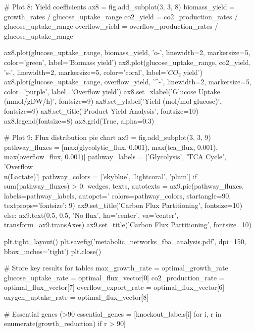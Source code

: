 \documentclass[a4paper, 11pt]{article}
\begin{document}
\begin{pycode}
# Plot 8: Yield coefficients
ax8 = fig.add_subplot(3, 3, 8)
biomass_yield = growth_rates / glucose_uptake_range
co2_yield = co2_production_rates / glucose_uptake_range
overflow_yield = overflow_production_rates / glucose_uptake_range

ax8.plot(glucose_uptake_range, biomass_yield, 'o-', linewidth=2, markersize=5,
         color='green', label='Biomass yield')
ax8.plot(glucose_uptake_range, co2_yield, 's-', linewidth=2, markersize=5,
         color='coral', label='$CO_2$ yield')
ax8.plot(glucose_uptake_range, overflow_yield, '^-', linewidth=2, markersize=5,
         color='purple', label='Overflow yield')
ax8.set_xlabel('Glucose Uptake (mmol/gDW/h)', fontsize=9)
ax8.set_ylabel('Yield (mol/mol glucose)', fontsize=9)
ax8.set_title('Product Yield Analysis', fontsize=10)
ax8.legend(fontsize=8)
ax8.grid(True, alpha=0.3)

# Plot 9: Flux distribution pie chart
ax9 = fig.add_subplot(3, 3, 9)
pathway_fluxes = [max(glycolytic_flux, 0.001), max(tca_flux, 0.001), max(overflow_flux, 0.001)]
pathway_labels = ['Glycolysis', 'TCA Cycle', 'Overflow\\n(Lactate)']
pathway_colors = ['skyblue', 'lightcoral', 'plum']
if sum(pathway_fluxes) > 0:
    wedges, texts, autotexts = ax9.pie(pathway_fluxes, labels=pathway_labels, autopct='%
                                         colors=pathway_colors, startangle=90, textprops={'fontsize': 9})
    ax9.set_title('Carbon Flux Partitioning', fontsize=10)
else:
    ax9.text(0.5, 0.5, 'No flux', ha='center', va='center', transform=ax9.transAxes)
    ax9.set_title('Carbon Flux Partitioning', fontsize=10)

plt.tight_layout()
plt.savefig('metabolic_networks_fba_analysis.pdf', dpi=150, bbox_inches='tight')
plt.close()

# Store key results for tables
max_growth_rate = optimal_growth_rate
glucose_uptake_rate = optimal_flux_vector[0]
co2_production_rate = optimal_flux_vector[7]
overflow_export_rate = optimal_flux_vector[6]
oxygen_uptake_rate = optimal_flux_vector[8]

# Essential genes (>90%
essential_genes = [knockout_labels[i] for i, r in enumerate(growth_reduction) if r > 90]
\end{pycode}
\end{document}
